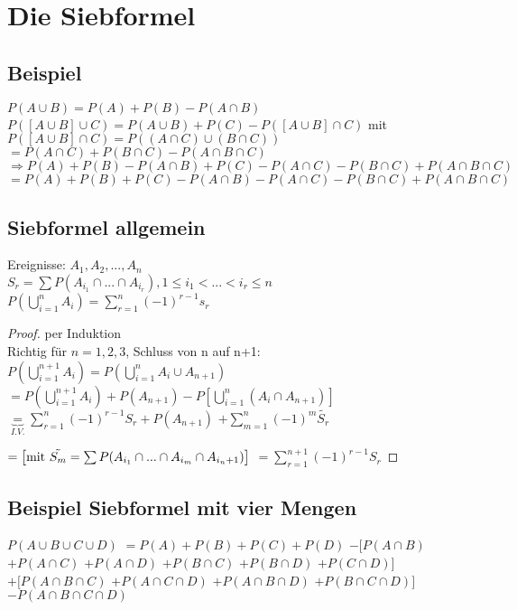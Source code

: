 \renewcommand{\ldate}{2015-10-27}

\section{Die Siebformel}

\subsection{Beispiel}
$P(A\cup B) = P(A) + P(B) - P(A\cap B)$\\
$P([A\cup B]\cup C) = P(A\cup B) + P(C) - P([A\cup B]\cap C)$ mit 
$P([A\cup B]\cap C) = P((A\cap C) \cup (B\cap C))$
$=P(A\cap C) + P(B\cap C) - P(A\cap B\cap C)$\\
$\Rightarrow P(A) + P(B) - P(A\cap B) + P(C) - P(A\cap C) - P(B\cap C) + P(A\cap B\cap C)$
$=P(A) + P(B) + P(C) - P(A\cap B) - P(A\cap C) - P(B\cap C) + P(A\cap B\cap C)$

\subsection{Siebformel allgemein}
Ereignisse: $A_1, A_2, ..., A_n$\\
$ S_r = \sum P(A_{i_1} \cap ... \cap A_{i_r}), 1\leq	 i_1 < ... < i_r \leq n $
$P(\bigcup_{i=1}^{n} A_i) = \sum_{r=1}^{n} (-1)^{r-1} s_r$

\begin{proof} per Induktion\\
Richtig für $n=1,2,3$, Schluss von n auf n+1:\\
$ P(\bigcup_{i=1}^{n+1} A_i) = P(\bigcup_{i=1}^n A_i \cup A_{n+1})$
$=P(\bigcup_{i=1}^{n+1} A_i) + P(A_{n+1}) - P[\bigcup_{i=1}^{n} (A_i \cap A_{n+1})]$
$\underbrace{=}_{I.V.} \sum_{r=1}^{n} (-1)^{r-1} S_r + P(A_{n+1})$
$ + \sum_{m=1}^{n} (-1)^m \tilde{S_r}$

$=  \left[ \textrm{mit } \tilde{S_m} = \sum P(A_{i_1} \cap ... \cap A_{i_m} \cap A_{i_n+1}) \right] $
$= \sum_{r=1}^{n+1} (-1)^{r-1} S_r$
\end{proof}

\subsection{Beispiel Siebformel mit vier Mengen}
$ P(A \cup B \cup C \cup D)$
$= P(A)+P(B)+P(C)+P(D)$
$- [P(A\cap B)$
$ + P(A\cap C) $
$ + P(A\cap D) $
$+ P(B\cap C) $
$+ P(B\cap D) $
$+ P(C\cap D)]$
$+[P(A\cap B\cap C) $
$+ P(A\cap C\cap D) $
$+ P(A\cap B\cap D) $
$+ P(B\cap C\cap D)]$
$- P(A\cap B\cap C\cap D)$

